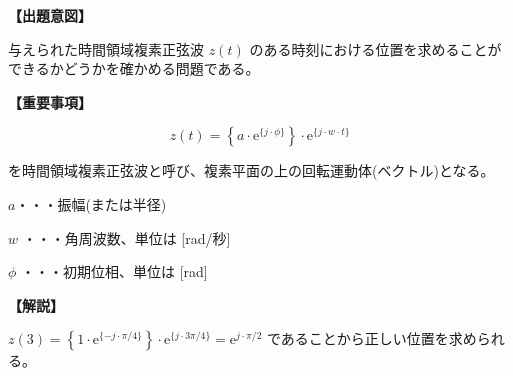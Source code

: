 \noindent \textbf{【出題意図】}

\bigskip
\noindent 与えられた時間領域複素正弦波 $z(t)$ のある時刻における位置を求めることができるかどうかを確かめる問題である。

\vspace{1em}
\noindent \textbf{【重要事項】}

\[
z(t) =  \left \{ a \cdot \textrm{e}^{\{j \cdot \phi\}} \right \} 
\cdot \textrm{e}^{\{j \cdot w \cdot t \}}
\]

\bigskip
\noindent を時間領域複素正弦波と呼び、複素平面の上の回転運動体(ベクトル)となる。

\bigskip
\noindent\quad  $a$・・・振幅(または半径)

\bigskip
\noindent\quad $w$ ・・・角周波数、単位は [rad/秒]

\bigskip
\noindent\quad $\phi$ ・・・初期位相、単位は [rad]

\bigskip

\vspace{1em}
\noindent \textbf{【解説】}

\bigskip
\noindent $z(3) = \left \{ 1 \cdot \textrm{e}^{\{-j \cdot \pi/4 \}} \right \} \cdot \textrm{e}^{\{ j \cdot 3 \pi/4 \}} = \textrm{e}^{j \cdot \pi / 2}$ であることから正しい位置を求められる。

